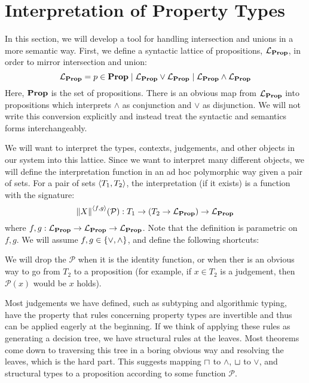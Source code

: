 
\section{Interpretation of Property Types}

In this section, we will develop a tool for handling intersection and unions in a more semantic way. First, we define a syntactic lattice of propositions, $\mathcal{L}_{{\mathbf{Prop}}}$, in order to mirror intersection and union:
$$
\mathcal{L}_{{\mathbf{Prop}}} = p \in {\mathbf{Prop}}
             \mid \mathcal{L}_{{\mathbf{Prop}}} \vee \mathcal{L}_{{\mathbf{Prop}}}
             \mid \mathcal{L}_{{\mathbf{Prop}}} \wedge \mathcal{L}_{{\mathbf{Prop}}}
$$
Here, ${\mathbf{Prop}}$ is the set of propositions. There is an obvious map from $\mathcal{L}_{{\mathbf{Prop}}}$ into propositions which interprets $\wedge$ as conjunction and $\vee$ as disjunction. We will not write this conversion explicitly and instead treat the syntactic and semantics forms interchangeably.

We will want to interpret the types, contexts, judgements, and other objects in our system into this lattice. Since we want to interpret many different objects, we will define the interpretation function in an ad hoc polymorphic way given a pair of sets. For a pair of sets $\left\langle T_1, T_2\right\rangle$, the interpretation (if it exists) is a function with the signature:
$$
  \interpGJ X {\pair f g}  : T_1 \to (T_2 \to \propLattice) \to \propLattice
$$
where $f, g : \mathcal{L}_{{\mathbf{Prop}}} \to \mathcal{L}_{{\mathbf{Prop}}} \to \mathcal{L}_{{\mathbf{Prop}}}$. Note that the definition is parametric on $f,g$. We will assume $f,g \in \lbrace\vee, \wedge\rbrace$,  and define the following shortcuts:
 We will drop the $\mathcal P$ when it is the identity function, or when ther is an obvious way to go from $T_2$ to a proposition (for example, if $x \in T_2$ is a judgement, then $\mathcal P {(x)}$ would be $x$ holds).

Most judgements we have defined, such as subtyping and algorithmic typing, have the property that rules concerning property types are invertible and thus can be applied eagerly at the beginning. If we think of applying these rules as generating a decision tree, we have structural rules at the leaves. Most theorems come down to traversing this tree in a boring obvious way and resolving the leaves, which is the hard part. This suggests mapping $\mathbin{\sqcap}$ to $\wedge$, $\mathbin{\sqcup}$ to $\vee$, and structural types to a proposition according to some function $\mathcal P$.

